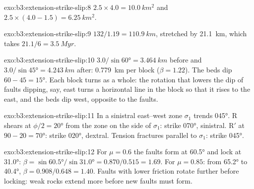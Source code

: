 \begin{solution}{exo:b3:extension-strike-slip:8}
$2.5\times4.0 = \qty{10.0}{km^2}$ and $2.5\times(4.0 - 1.5) =
\qty{6.25}{km^2}$.
\end{solution}

\begin{solution}{exo:b3:extension-strike-slip:9}
$132/1.19 = \qty{110.9}{km}$, stretched by \qty{21.1}{km}, which takes
$21.1/6 = \qty{3.5}{Myr}$.
\end{solution}

\begin{solution}{exo:b3:extension-strike-slip:10}
$3.0/\sin\ang{60} = \qty{3.464}{km}$ before and $3.0/\sin\ang{45} =
\qty{4.243}{km}$ after: \qty{0.779}{km} per block ($\beta = 1.22$). The beds
dip $60 - 45 = \ang{15}$. Each block turns as a whole: the rotation that
lowers the dip of faults dipping, say, east turns a horizontal line in the
block so that it rises to the east, and the beds dip west, opposite to the
faults.
\end{solution}

\begin{solution}{exo:b3:extension-strike-slip:11}
In a sinistral east--west zone $\sigma_1$ trends \ang{045}. R shears at
$\phi/2 = \ang{20}$ from the zone on the side of $\sigma_1$: strike \ang{070},
sinistral. R$'$ at $90 - 20 = \ang{70}$: strike \ang{020}, dextral. Tension
fractures parallel to $\sigma_1$: strike \ang{045}.
\end{solution}

\begin{solution}{exo:b3:extension-strike-slip:12}
For $\mu = 0.6$ the faults form at \ang{60.5} and lock at \ang{31.0}: $\beta =
\sin\ang{60.5}/\sin\ang{31.0} = 0.870/0.515 = 1.69$. For $\mu = 0.85$: from
\ang{65.2} to \ang{40.4}, $\beta = 0.908/0.648 = 1.40$. Faults with lower
friction rotate further before locking: weak rocks extend more before new
faults must form.
\end{solution}


